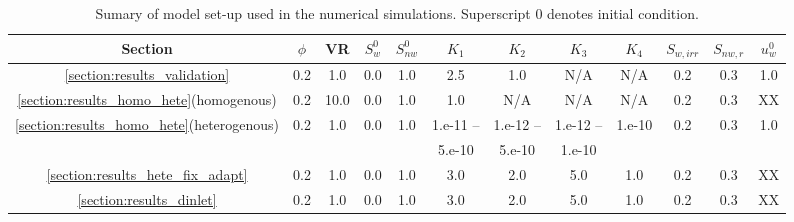 
\begin{landscape}
\begin{table}
  \begin{tabular}{c | c c  c  c  c  c  c  c  c  c   c}
    \hline
      {\bf Section} & $\phi$ & VR  & $S^{0}_{w}$ & $S^{0}_{nw}$ & $K_{1}$ & $K_{2}$ & $K_{3}$ & $K_{4}$ & $S_{w,irr}$ & $S_{nw,r}$ & $u^{0}_{w}$ \\ 
    \hline
     \ref{section:results_validation} & 0.2 & 1.0 & 0.0 & 1.0 & 2.5 & 1.0 & N/A & N/A & 0.2 & 0.3 & 1.0 \\
     \ref{section:results_homo_hete}(homogenous)  & 0.2 & 10.0 & 0.0 & 1.0 & 1.0 & N/A & N/A & N/A & 0.2 & 0.3 & XX  \\
     \ref{section:results_homo_hete}(heterogenous) & 0.2 & 1.0 & 0.0 & 1.0 & 1.e-11 -- & 1.e-12 -- & 1.e-12 -- & 1.e-10 & 0.2  & 0.3 & 1.0 \\
      &   &  &  &  & 5.e-10 & 5.e-10 & 1.e-10  &  &  &  & \\
     \ref{section:results_hete_fix_adapt}  & 0.2 & 1.0 & 0.0 & 1.0  & 3.0 & 2.0 & 5.0 & 1.0 & 0.2 & 0.3 & XX  \\
     \ref{section:results_dinlet}  & 0.2 & 1.0 & 0.0 & 1.0 & 3.0 & 2.0 & 5.0 & 1.0 & 0.2  & 0.3 & XX  \\
     \hline
   \end{tabular}
   \caption{Sumary of model set-up used in the numerical simulations. Superscript $0$ denotes initial condition. }\label{table:setup}
\end{table}
\end{landscape}
\clearpage









